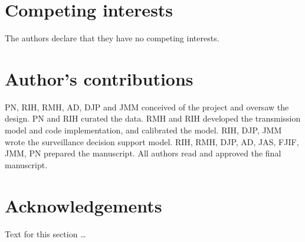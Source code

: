 \documentclass[doublespacing]{bmcart}
\begin{document}
\begin{backmatter}

\section*{Competing interests}
  The authors declare that they have no competing interests.

\section*{Author's contributions}
    PN, RIH, RMH, AD, DJP and JMM conceived of the project and oversaw the design. PN and RIH curated the data. RMH and RIH developed the transmission model and code implementation, and calibrated the model. RIH, DJP, JMM wrote the surveillance decision support model. RIH, RMH, DJP, AD, JAS, FJIF, JMM, PN prepared the manuscript. All authors read and approved the final manuscript.

\section*{Acknowledgements}
  Text for this section \ldots




\end{backmatter}
\end{document}
